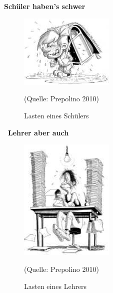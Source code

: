 
\begin{center}
	\textbf{Schüler haben's schwer \punkte}\\
\end{center}


\begin{figure}[h]
	\centering
		\includegraphics[width=0.4\textwidth]{images/Lasten-eines-Schuelers.jpg}\\
	\caption{Lasten eines Schülers}
	\label{fig:Lasten-eines-Schuelers}
	\footnotesize(Quelle: Prepolino 2010)
\end{figure}

\vspace*{20mm}

\begin{center}
	\textbf{\punkte\ Lehrer aber auch}\\
\end{center}


\begin{figure}[h]
	\centering
		\includegraphics[width=0.4\textwidth]{images/Lasten-eines-Lehrers.jpg}\\
	\caption{Lasten eines Lehrers}
	\label{fig:Lasten-eines-Lehrers}
	\footnotesize(Quelle: Prepolino 2010)
\end{figure}





